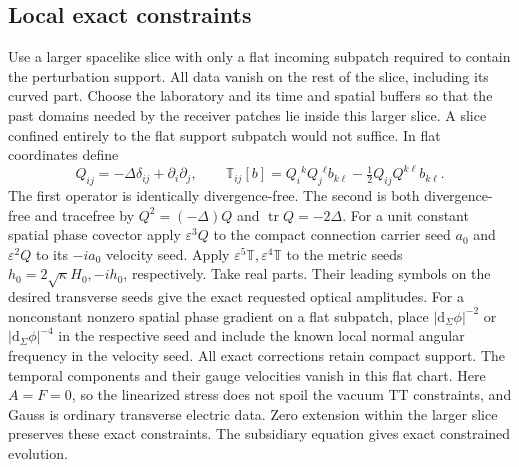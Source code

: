 \documentclass[11pt]{article}
\newcommand{\dd}{\mathrm d}
\newcommand{\eps}{\varepsilon}
\newcommand{\tr}{\operatorname{tr}}
\begin{document}
\subsection{Local exact constraints}
Use a larger spacelike slice with only a flat incoming
subpatch required to contain the perturbation support.
All data vanish on the rest of the slice, including its
curved part. Choose the laboratory and its time and spatial
buffers so that the past domains needed by the receiver
patches lie inside this larger slice. A slice confined
entirely to the flat support subpatch would not suffice.
In flat coordinates define
\[
 Q_{ij}=-\Delta\delta_{ij}+\partial_i\partial_j,\qquad
 \mathbb T_{ij}[b]=Q_i{}^kQ_j{}^\ell b_{k\ell}
                   -\tfrac12 Q_{ij}Q^{k\ell}b_{k\ell}.
\]
The first operator is identically divergence-free. The
second is both divergence-free and tracefree by
\(Q^2=(-\Delta)Q\) and \(\tr Q=-2\Delta\).
For a unit constant spatial phase covector apply
\(\eps^3 Q\) to the compact connection carrier seed \(a_0\)
and \(\eps^2Q\) to its \(-ia_0\) velocity seed. Apply
\(\eps^5\mathbb T,\eps^4\mathbb T\) to the metric seeds
\(h_0=2\sqrt\kappa H_0,-ih_0\), respectively.
Take real parts. Their leading symbols on the desired
transverse seeds give the exact requested optical amplitudes.
For a nonconstant nonzero spatial phase gradient on a flat
subpatch, place \(|\dd_\Sigma\phi|^{-2}\) or
\(|\dd_\Sigma\phi|^{-4}\) in the respective seed and include
the known local normal angular frequency in the velocity
seed. All exact corrections retain compact support.
The temporal components and their gauge velocities vanish
in this flat chart. Here \(A=F=0\), so the linearized
stress does not spoil the vacuum TT constraints, and
Gauss is ordinary transverse electric data. Zero extension
within the larger slice preserves these exact constraints.
The subsidiary equation gives exact constrained evolution.
\end{document}
